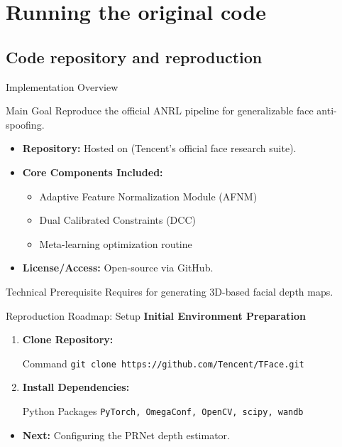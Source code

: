\section{Running the original code}
\subsection{Code repository and reproduction}

\begin{frame}{Implementation Overview}
    \begin{block}{Main Goal}
        Reproduce the official ANRL pipeline for generalizable face anti-spoofing.
    \end{block}

    \begin{itemize}
        \item \textbf{Repository:} Hosted on  (Tencent's official face research suite).
        \item \textbf{Core Components Included:}
            \begin{itemize}
                \item Adaptive Feature Normalization Module (AFNM)
                \item Dual Calibrated Constraints (DCC)
                \item Meta-learning optimization routine
            \end{itemize}
        \item \textbf{License/Access:} Open-source via GitHub.
    \end{itemize}

    \begin{alertblock}{Technical Prerequisite}
        Requires  for generating 3D-based facial depth maps.
    \end{alertblock}
\end{frame}

\begin{frame}{Reproduction Roadmap: Setup}
    \textbf{Initial Environment Preparation}
    \begin{enumerate}
        \item \textbf{Clone Repository:}
            \begin{exampleblock}{Command}
                \texttt{git clone https://github.com/Tencent/TFace.git}
            \end{exampleblock}
        \item \textbf{Install Dependencies:}
            \begin{exampleblock}{Python Packages}
                \texttt{PyTorch, OmegaConf, OpenCV, scipy, wandb}
            \end{exampleblock}
    \end{enumerate}
    \vfill
    \begin{itemize}
        \item \textbf{Next:} Configuring the PRNet depth estimator.
    \end{itemize}
\end{frame}

